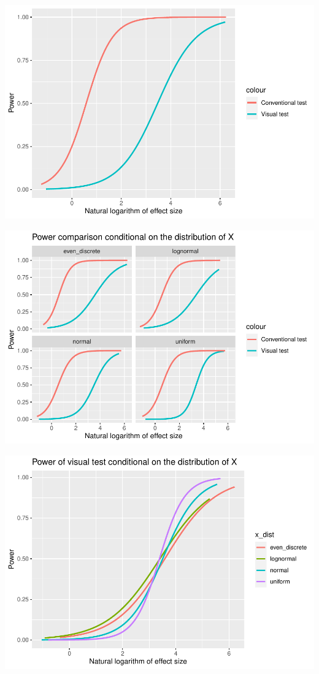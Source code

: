 \documentclass[]{interact}
\theoremstyle{plain}%
\theoremstyle{definition}
\theoremstyle{remark}
\begin{document}
\includegraphics{paper_comparison_files/figure-latex/power-vs-log-effect-size-1.pdf}

\includegraphics{paper_comparison_files/figure-latex/power-vs-log-effect-size-given-x-dist-1.pdf}

\includegraphics{paper_comparison_files/figure-latex/power-of-visual-test-given-x-dist-1.pdf}
\end{document}
